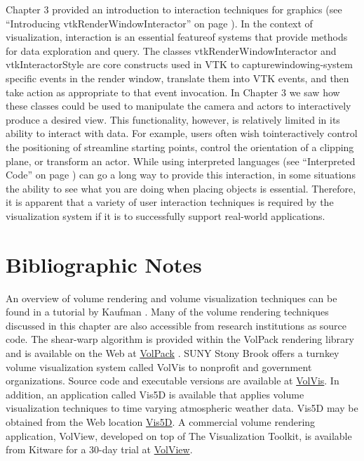 Chapter 3 provided an introduction to interaction techniques for graphics (see ``Introducing vtkRenderWindowInteractor'' on page \pageref{pg:rwi} ).
In the context of visualization, interaction is an essential featureof systems that provide methods for data exploration and query. The classes
vtkRenderWindowInteractor and vtkInteractorStyle are core constructs used in VTK to capturewindowing-system specific events in the render window, translate them into VTK events, and then take action as appropriate to that event invocation.
In Chapter 3 we saw how these classes could be used to manipulate the camera and actors to interactively produce a desired view. This functionality, however, is relatively limited in its ability to interact with data. For example, users often wish tointeractively control the positioning of streamline starting points, control the orientation of a clipping plane, or transform an actor. While using interpreted languages (see ``Interpreted Code'' on page \pageref{pg:rwi} ) can go a long way to provide this interaction, in some situations the ability to see what you are doing when placing objects is essential. Therefore, it is apparent that a variety of user interaction techniques is required by the visualization system if it is to successfully support real-world applications.

\section{Bibliographic Notes}

An overview of volume rendering and volume visualization techniques can be found in a tutorial by Kaufman \cite{Kaufman91}. Many of the volume rendering techniques discussed in this chapter are also accessible from research institutions as source code. The shear-warp algorithm is provided within the VolPack rendering library and is available on the Web at \href{http:www-graphics.stanford.edu/software/volpack/}{VolPack} . SUNY Stony Brook offers a turnkey volume visualization system called VolVis to nonprofit and government organizations. Source code and executable versions are available at \href{http://www.cs.sunysb.edu/\~volvis}{VolVis}. In addition, an application called Vis5D is available that applies volume visualization techniques to time varying atmospheric weather data. Vis5D may be obtained from the Web location \href{http://vis5d.sourceforge.net}{Vis5D}. A commercial volume rendering application, VolView, developed on top of The Visualization Toolkit, is available from Kitware for a 30-day trial at \href{http://www.kitware.com/products/volview.html}{VolView}.

